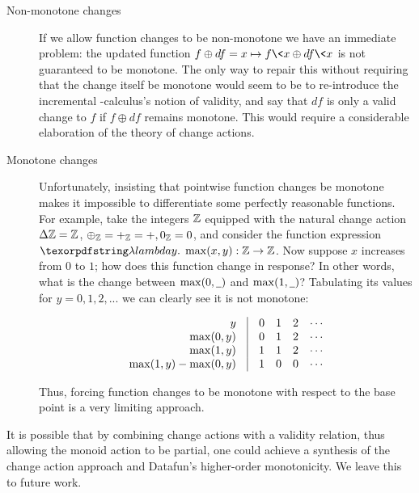 \begin{description}
\item[Non-monotone changes] If we allow function changes to be non-monotone we have an immediate problem: the updated function $f \oplus df = x \mapsto f\<x \oplus df\<x$ is not guaranteed to be monotone. The only way to repair this without requiring that the change itself be monotone would seem to be to re-introduce the incremental \fn-calculus's notion of validity, and say that $df$ is only a valid change to $f$ if $f \oplus df$ remains monotone. This would require a considerable elaboration of the theory of change actions.
  
\item[Monotone changes] Unfortunately, insisting that pointwise function changes be monotone makes it impossible to differentiate some perfectly reasonable functions. For example, take the integers $\mathbb{Z}$ equipped with the natural change action $\Delta\mathbb{Z} = \mathbb{Z}$, ${\oplus}_{\mathbb{Z}} = {+}_{\mathbb{Z}} = +, 0_{\mathbb{Z}} = 0$, and consider the function expression $\fnof{y} \max(x, y) : \Z \to \Z$. Now suppose $x$ increases from $0$ to $1$; how does this function change in response? In other words, what is the change between $\max(0, \pwild)$ and $\max(1, \pwild)$? Tabulating its values for $y = 0,1,2, ...$ we can clearly see it is not monotone:

  \[
    \begin{array}{r@{\quad}|@{\quad}llllll}
      y & 0 & 1 & 2 & \cdots\\%
      \max(0, y) & 0 & 1 & 2 & \cdots\\
      \max(1, y) & 1 & 1 & 2 & \cdots\\
      \max(1, y) - \max(0, y) & 1 & 0 & 0 & \cdots
    \end{array}
  \]

  \noindent
  Thus, forcing function changes to be monotone with respect to the base point is a very limiting approach.
\end{description}

\noindent
It is possible that by combining change actions with a validity relation, thus allowing the monoid action to be partial, one could achieve a synthesis of the change action approach and Datafun's higher-order monotonicity. We leave this to future work.


